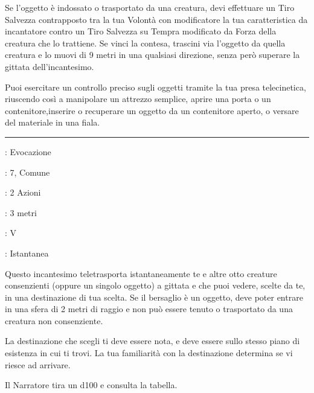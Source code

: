 \begin{multicols}{2}
Se l'oggetto è indossato o trasportato da una creatura, devi effettuare un Tiro Salvezza contrapposto tra la tua Volontà con modificatore la tua caratteristica da incantatore contro un Tiro Salvezza su Tempra modificato da Forza della creatura che lo trattiene. Se vinci la contesa, trascini via l'oggetto da quella creatura e lo muovi di 9 metri in una qualsiasi direzione, senza però superare la gittata dell'incantesimo.

Puoi esercitare un controllo preciso sugli oggetti tramite la tua presa telecinetica, riuscendo così a manipolare un attrezzo semplice, aprire una porta o un contenitore,inserire o recuperare un oggetto da un contenitore aperto, o versare del materiale in una fiala.

\smallskip\noindent\rule{\linewidth}{2pt} \hypertarget{Teletrasporto}{}\medskip{}
\noindent
\begin{description}[noitemsep, topsep=0pt, parsep=0pt, partopsep=0pt, leftmargin=0cm, labelwidth=2.8cm]
	\item[\textbf{Lista di Magia}]: Evocazione
	\item[\textbf{Livello}]: 7, Comune
	\item[\textbf{T. di Lancio}]: 2 Azioni
	\item[\textbf{Gittata}]: 3 metri
	\item[\textbf{Componenti}]: V
	\item[\textbf{Durata}]: Istantanea
\end{description}

Questo incantesimo teletrasporta istantaneamente te e altre otto creature consenzienti (oppure un singolo oggetto) a gittata e che puoi vedere, scelte da te, in una destinazione di tua scelta. Se il bersaglio è un oggetto, deve poter entrare in una sfera di 2 metri di raggio e non può essere tenuto o trasportato da una creatura non consenziente.

La destinazione che scegli ti deve essere nota, e deve essere sullo stesso piano di esistenza in cui ti trovi. La tua familiarità con la destinazione determina se vi riesce ad arrivare.

Il Narratore tira un d100 e consulta la tabella.


\end{multicols}

